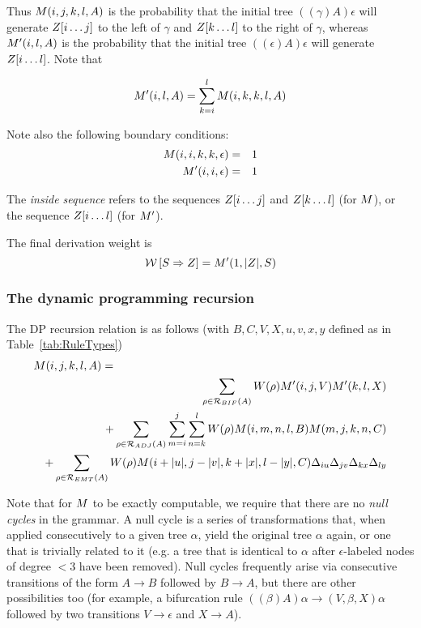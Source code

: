 \documentclass[10pt]{article}
\newcommand{\tabnum}[1]{\ref{tab:#1}}
\newcommand{\tabref}[1]{Table~\tabnum{#1}}
\begin{document}
Thus $M(i,j,k,l,A)$ is the probability that the initial tree $((\gamma)A)\epsilon$ will generate 
$Z[i \ldots j]$ to the left of $\gamma$ and $Z[k \ldots l]$ to the right of $\gamma$,
whereas $M'(i,l,A)$ is the probability that the initial tree $((\epsilon)A)\epsilon$ will generate 
$Z[i \ldots l]$.
Note that

\[
M'(i,l,A) = \sum_{k=i}^l M(i,k,k,l,A)
\]

Note also the following boundary conditions:
\begin{eqnarray*}
M(i,i,k,k,\epsilon) & = & 1 \\
M'(i,i,\epsilon) & = & 1
\end{eqnarray*}

The {\em inside sequence} refers to the sequences $Z[i \ldots j]$ and $Z[k \ldots l]$ (for $M$),
or the sequence $Z[i \ldots l]$ (for $M'$).

The final derivation weight is
\[
{\cal W} \left[ {S} \Rightarrow {Z} \right] = M'(1,|Z|,S)
\]

\subsubsection{The dynamic programming recursion}

The DP recursion relation is as follows (with $B,C,V,X,u,v,x,y$ defined as in \tabref{RuleTypes})
\begin{eqnarray*}
\lefteqn{\m(i,j,k,l,A) =} \\
& &
\sum_{\rho \in \rulesubset{BIF}{A}} W(\rho) \mtip(i,j,V) \mtip(k,l,X) \\
& & +
\sum_{\rho \in \rulesubset{ADJ}{A}} \sum_{m=i}^j \sum_{n=k}^l W(\rho) \m(i,m,n,l,B) \m(m,j,k,n,C) \\
& & +
\sum_{\rho \in \rulesubset{EMT}{A}} W(\rho) \m(i+|u|,j-|v|,k+|x|,l-|y|,C) \iumatch \jvmatch \kxmatch \lymatch
\end{eqnarray*}

Note that for $M$ to be exactly computable, we require that there are no {\em null cycles} in the grammar.
A null cycle is a series of transformations that, when applied consecutively to a given tree $\alpha$, yield the original tree $\alpha$ again,
or one that is trivially related to it (e.g. a tree that is identical to $\alpha$ after $\epsilon$-labeled nodes of degree $<3$ have been removed).
Null cycles frequently arise via consecutive transitions of the form $A \to B$ followed by $B \to A$,
but there are other possibilities too (for example, a bifurcation rule $((\beta)A)\alpha \to (V,\beta,X)\alpha$
followed by two transitions $V \to \epsilon$ and $X \to A$).
\end{document}
